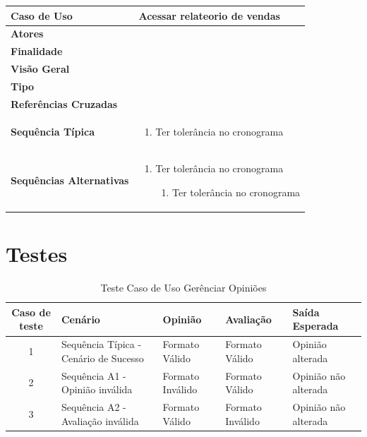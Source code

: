 \documentclass[a4paper,11pt]{article}
\begin{document}
\begin{table}[H]
		\begin{tabularx}{\textwidth}{|l|X|}
		\hline
			\textbf{Caso de Uso} &  Acessar relateorio de vendas \\ \hline
			\textbf{Atores} &    \\ \hline
			\textbf{Finalidade} &   \\ \hline
			\textbf{Visão Geral} &  \\ \hline
			\textbf{Tipo} &  \\ \hline
			\textbf{Referências Cruzadas} &  \\ \hline
			\textbf{Sequência Típica} & 
			\begin{enumerate}
			\item Ter tolerância no cronograma
			\end{enumerate} \\ \hline
			\textbf{Sequências Alternativas} & 
			\begin{enumerate}
			\item Ter tolerância no cronograma
			\begin{enumerate}
			\item Ter tolerância no cronograma
			\end{enumerate}
			\end{enumerate} \\ \hline
		\end{tabularx}
\end{table}

\section{Testes}
	\begin{center}
	\begin{table}[H]
		\begin{tabularx}{\textwidth}{c|X|X|X|X}
			\textbf{Caso de teste} & \textbf{Cenário} & \textbf{Opinião} & \textbf{Avaliação} & \textbf{Saída Esperada} \\
			\hline
			1 & Sequência Típica - Cenário de Sucesso & Formato Válido & Formato Válido & Opinião alterada\\ \hline
			2 & Sequência A1 - Opinião inválida & Formato Inválido & Formato Válido & Opinião não alterada\\ \hline
			3 & Sequência A2 - Avaliação inválida & Formato Válido & Formato Inválido & Opinião não alterada\\ \hline
			
		\end{tabularx}
		\caption{Teste Caso de Uso Gerênciar Opiniões}
	\end{table}
	\end{center}
	
\end{document}
